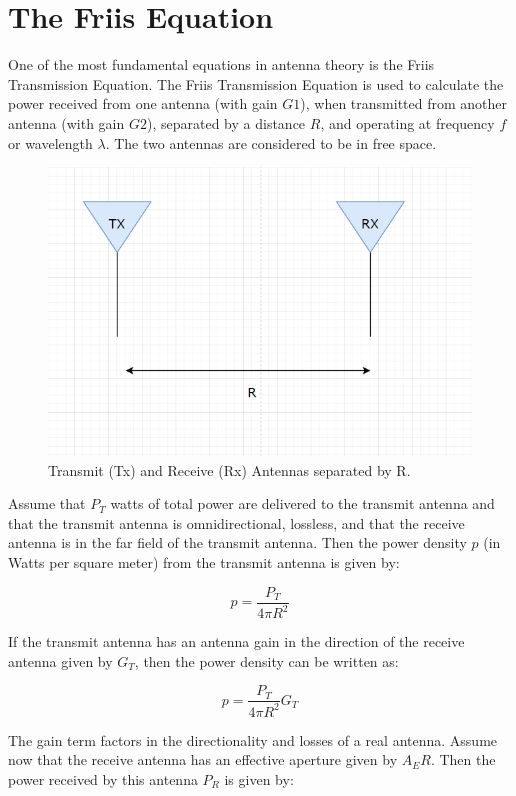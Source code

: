 \documentclass[a4paper,12pt]{report}
\begin{document}
\section{The Friis Equation}

One of the most fundamental equations in antenna theory is the Friis Transmission Equation.
The Friis Transmission Equation is used to calculate the power
received from one antenna
(with gain $G1$), when transmitted from another antenna (with gain $G2$),
separated by a distance $R$, and operating at frequency $f$ or wavelength $\lambda$. 
The two antennas are considered to be in free space.

\begin{figure}
  \begin{center}
    \includegraphics[clip, keepaspectratio, width=0.5\linewidth]{img/friis_equation.png}
    \caption{Transmit (Tx) and Receive (Rx) Antennas separated by R.}
    \label{fig:friis_equation}
  \end{center}
\end{figure}

Assume that $P_T$ watts of total power are delivered
to the transmit antenna and that the transmit antenna is omnidirectional, lossless,
and that the receive antenna is in the far field of the transmit antenna.
Then the power density $p$ (in Watts per square meter)
from the transmit antenna is given by:

\begin{equation}
  p = \frac{P_T}{4\pi R^2}
\end{equation}

If the transmit antenna has an antenna gain
in the direction of the receive antenna given by $G_T$,
then the power density can be written as:

\begin{equation}
  p = \frac{P_T}{4\pi R^2} G_T
\end{equation}

The gain term factors in the directionality and losses of a real antenna.
Assume now that the receive antenna has an effective aperture given by $A_ER$.
Then the power received by this antenna $P_R$ is given by:
\end{document}
